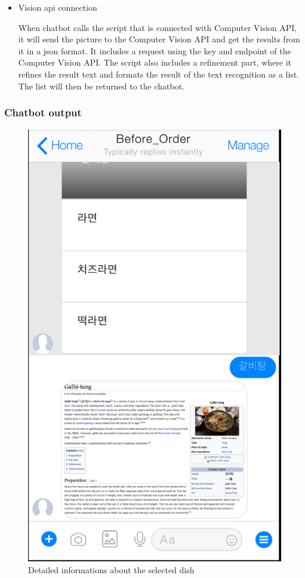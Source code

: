 \begin{itemize}
\item Vision api connection

When chatbot calls the script that is connected with Computer Vision API, it will send the picture to the Computer Vision API and get the results from it in a json format. It includes a request using the key and endpoint of the Computer Vision API. The script also includes a refinement part, where it refines the result text and formats the result of the text recognition as a list. The list will then be returned to the chatbot.
\end{itemize}
\FloatBarrier

\subsubsection{Chatbot output}

\begin{figure}[htbp]
\centerline{\includegraphics[height=\custompicheight]{./pictures/facebook_dish_information}}
\caption{Detailed informations about the selected dish}
\label{fig:facebook_dish_information}
\end{figure}
\FloatBarrier

